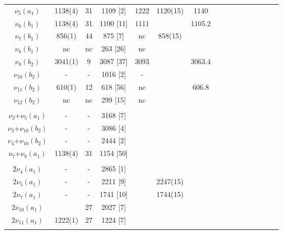 \begin{ThreePartTable}
\begin{longtable}{*{16}{c}}
        $\nu_{5}(a_1)$                & 1138(4)     & 31 & 1109 [2]   & 1222 & 1120(15) & 1140     \\
        $\nu_{6}(b_1)$                & 1138(4)     & 31 & 1100 [11]  & 1111 &          & 1105.2   \\
        $\nu_{7}(b_1)$                & 856(1)      & 44 & 875 [7]    & nc   & 858(15)  &          \\
        $\nu_{8}(b_1)$                & nc          & nc & 263 [26]   & nc   &          &          \\
        $\nu_{9}(b_2)$                &3041(1)\tnote{b, t}  & 9  & 3087 [37]  & 3093 &          & 3063.4   \\
        $\nu_{10}(b_2)$               & -           &  - & 1016 [2]   & -    &          &          \\
        $\nu_{11}(b_2)$               & 610(1)      & 12 & 618 [56]   & nc   &          & 606.8    \\
        $\nu_{12}(b_2)$               & nc          & nc & 299 [15]   & nc   &          &          \\\\
     
        $\nu_{3}$+$\nu_{5}(a_1)$      & -          &  - & 3168 [7]   &      &          &   \\
        $\nu_{3}$+$\nu_{10}(b_2)$     & -          &  - & 3086 [4]   &      &          &   \\
        $\nu_{4}$+$\nu_{10}(b_2)$     & -          &  - & 2444 [2]   &      &          &   \\
        $\nu_{7}$+$\nu_{8}(a_1)$      & 1138(4)    & 31 & 1154 [50]  &      &          &   \\\\
        
        $2\nu_{4}(a_1)$               &  -          & -  & 2865 [1]   &      &          &   \\
        $2\nu_{5}(a_1)$               &  -          & -  & 2211 [9]   &      & 2247(15) &   \\
        $2\nu_{7}(a_1)$               &  -          & -  & 1741 [10]  &      & 1744(15) &   \\
        $2\nu_{10}(a_1)$              &             & 27 & 2027 [7]   &      &          &   \\
        $2\nu_{11}(a_1)$              & 1222(1)     & 27 & 1224 [7]   &      &          &   \\\\

    \end{longtable}
\end{ThreePartTable}
